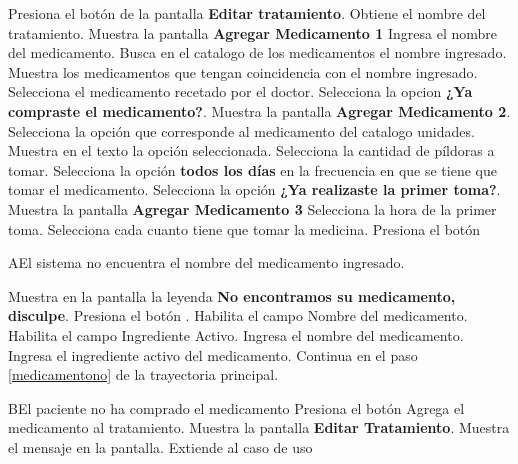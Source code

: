 \begin{UCtrayectoria}
	
	\UCpaso [\UCactor] Presiona el botón  de la pantalla \textbf{Editar tratamiento}.
	\UCpaso Obtiene el nombre del tratamiento.
	\UCpaso Muestra la pantalla \textbf{Agregar Medicamento 1}
	\UCpaso [\UCactor] Ingresa el nombre del medicamento.
	\UCpaso Busca en el catalogo de los medicamentos el nombre ingresado.
	\UCpaso Muestra los medicamentos que tengan coincidencia con el nombre ingresado.
	\UCpaso [\UCactor] Selecciona el medicamento recetado por el doctor.
	\UCpaso [\UCactor] Selecciona la opcion \textbf{¿Ya compraste el medicamento?}.  \label{medicamentono}
	\UCpaso Muestra la pantalla \textbf{Agregar Medicamento 2}.
	\UCpaso [\UCactor] Selecciona la opción que corresponde al medicamento del catalogo unidades.
	\UCpaso Muestra en el texto la opción seleccionada.
	\UCpaso [\UCactor] Selecciona la cantidad de píldoras a tomar.
	\UCpaso [\UCactor] Selecciona la opción \textbf{todos los días} en la frecuencia en que se tiene que tomar el medicamento.
	\UCpaso [\UCactor] Selecciona la opción \textbf{¿Ya realizaste la primer toma?}. \label{frecuencia}
	\UCpaso Muestra la pantalla \textbf{Agregar Medicamento 3}
	\UCpaso [\UCactor] Selecciona la hora de la primer toma.
	\UCpaso [\UCactor] Selecciona cada cuanto tiene que tomar la medicina.
	\UCpaso [\UCactor] Presiona el botón 
	
\end{UCtrayectoria}

\begin{UCtrayectoriaA}{A}{El sistema no encuentra el nombre del medicamento ingresado.}
	
	\UCpaso Muestra en la pantalla la leyenda \textbf{No encontramos su medicamento, disculpe}.
	\UCpaso[\UCactor] Presiona el botón .
	\UCpaso Habilita el campo Nombre del medicamento.
	\UCpaso Habilita el campo Ingrediente Activo.
	\UCpaso [\UCactor] Ingresa el nombre del medicamento.
	\UCpaso [\UCactor] Ingresa el ingrediente activo del medicamento.
	\UCpaso Continua en el paso \ref{medicamentono} de la trayectoria principal.
	
	
\end{UCtrayectoriaA}


\begin{UCtrayectoriaA}{B}{El paciente no ha comprado el medicamento}
	\UCpaso [\UCactor] Presiona el botón 
	\UCpaso Agrega el medicamento al tratamiento.
	\UCpaso Muestra la pantalla \textbf{Editar Tratamiento}.
	\UCpaso Muestra el mensaje  en la pantalla.
	\UCpaso Extiende al caso de uso 
\end{UCtrayectoriaA}


